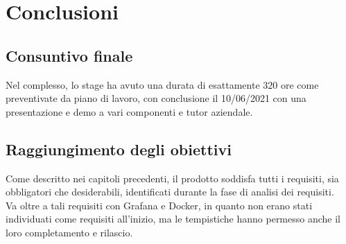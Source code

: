 
\chapter{Conclusioni}
\label{cap:conclusioni}
\section{Consuntivo finale}
	Nel complesso, lo stage ha avuto una durata di esattamente 320 ore come preventivate da piano di lavoro, con conclusione il 10/06/2021 con una presentazione e demo a vari componenti e tutor aziendale.\\


\section{Raggiungimento degli obiettivi}
	Come descritto nei capitoli precedenti, il prodotto soddisfa tutti i requisiti, sia obbligatori che desiderabili, identificati durante la fase di analisi dei requisiti. \\
	Va oltre a tali requisiti con Grafana e Docker, in quanto non erano stati individuati come requisiti all'inizio, ma le tempistiche hanno permesso anche il loro completamento e rilascio.

